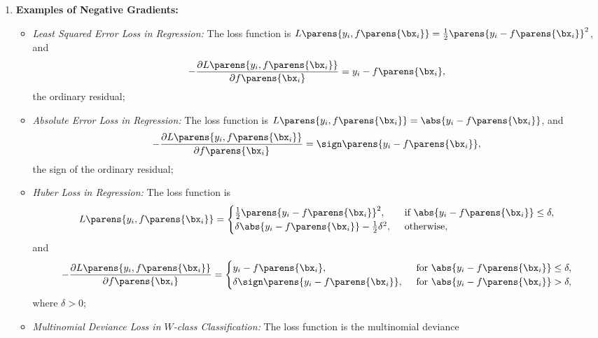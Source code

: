 \documentclass[12pt]{article}
\begin{document}
\begin{enumerate}[label=\textbf{\arabic*.}]
	
	\item \textbf{Examples of Negative Gradients:} 
	\begin{itemize}
		\item \textit{Least Squared Error Loss in Regression:} The loss function is $L \parens{y_i, f \parens{\bx_i}} = \frac{1}{2} \parens{y_i - f \parens{\bx_i}}^2$, and 
		\begin{align*}
			- \frac{\partial L \parens{y_i, f \parens{\bx_i}}}{\partial f \parens{\bx_i}} = y_i - f \parens{\bx_i}, 
		\end{align*}
		the ordinary residual; 
		\item \textit{Absolute Error Loss in Regression:} The loss function is $L \parens{y_i, f \parens{\bx_i}} = \abs{y_i - f \parens{\bx_i}}$, and 
		\begin{align*}
			- \frac{\partial L \parens{y_i, f \parens{\bx_i}}}{\partial f \parens{\bx_i}} = \sign \parens{y_i - f \parens{\bx_i}}, 
		\end{align*}
		the sign of the ordinary residual; 
		\item \textit{Huber Loss in Regression:} The loss function is 
		\begin{align*}
			L \parens{y_i, f \parens{\bx_i}} = \begin{cases}
				\frac{1}{2} \parens{y_i - f \parens{\bx_i}}^2, & \, \text{ if } \abs{y_i - f \parens{\bx_i}} \le \delta, \\ 
				\delta \abs{y_i - f \parens{\bx_i}} - \frac{1}{2} \delta^2, & \, \text{ otherwise}, 
			\end{cases}
		\end{align*}
		and 
		\begin{align*}
			- \frac{\partial L \parens{y_i, f \parens{\bx_i}} }{\partial f \parens{\bx_i} } = \begin{cases}
			y_i - f \parens{\bx_i}, & \, \text{ for } \abs{y_i - f \parens{\bx_i}} \le \delta, \\ 
			\delta \sign \parens{y_i - f \parens{\bx_i}}, & \, \text{ for } \abs{y_i - f \parens{\bx_i}} > \delta, 
			\end{cases} 
		\end{align*}
		where $\delta > 0$;  
		\item \textit{Multinomial Deviance Loss in $W$-class Classification:} The loss function is the multinomial deviance
		\begin{align*}

\end{align*}
\end{itemize}
\end{enumerate}
\end{document}
